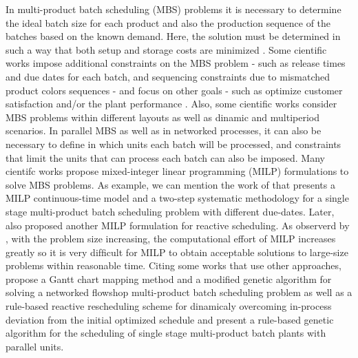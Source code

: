\documentclass[10pt,fleqn,a4paper,twoside]{article}
\begin{document}
In multi-product batch scheduling (MBS) problems it is necessary to determine the ideal batch size for each product and also the production sequence of the batches based on the known demand. Here, the solution must be determined in such a way that both setup and storage costs are minimized \citep{Eilon1985, Omega1993, LiuEtAl2020}. Some cientific works impose additional constraints on the MBS problem - such as release times and due dates for each batch, and sequencing constraints due to mismatched product colors sequences - and focus on other goals - such as optimize customer satisfaction and/or the plant performance \citep{MendezEtAll2000, ShiEtAll2017}. Also, some cientific works consider MBS problems within different layouts as well as dinamic and multiperiod scenarios. In parallel MBS as well as in networked processes, it can also be necessary to define in which units each batch will be processed, and constraints that limit the units that can process each batch can also be imposed. Many cientifc works propose mixed-integer linear programming (MILP) formulations to solve MBS problems. As example, we can mention the work of \cite{MendezEtAll2000} that presents a MILP continuous-time model and a two-step systematic methodology for a single stage multi-product batch scheduling problem with different due-dates. Later, \cite{MendezCerda2003} also proposed another MILP formulation for reactive scheduling. As observerd by \cite{HeHui2008}, with the problem size increasing, the computational effort of MILP increases greatly so it is very difﬁcult for MILP to obtain acceptable solutions to large-size problems within reasonable time. Citing some works that use other approaches, \cite {KimEtAl1996} propose a Gantt chart mapping method and a modified genetic algorithm for solving a networked flowshop multi-product batch scheduling problem as well as a rule-based reactive rescheduling scheme for dinamicaly overcoming in-process deviation from the initial optimized schedule and \cite{HeHui2008} present a rule-based genetic algorithm for the scheduling of single stage multi-product batch plants with parallel units.
\end{document}
